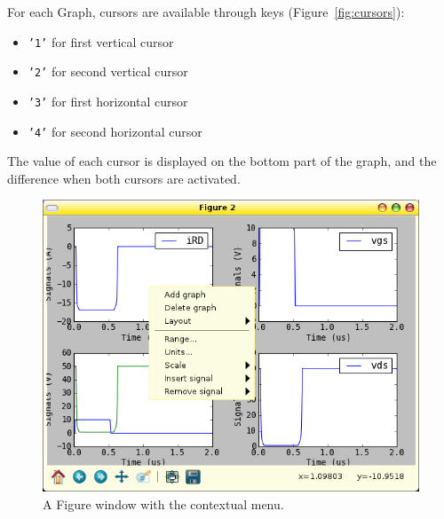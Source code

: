 \documentclass[a4paper,11pt]{article}
\begin{document}
For each Graph, cursors are available through keys (Figure~\ref{fig:cursors}):
\begin{itemize}
\item \texttt{'1'} for first vertical cursor
\item \texttt{'2'} for second vertical cursor
\item \texttt{'3'} for first horizontal cursor
\item \texttt{'4'} for second horizontal cursor
\end{itemize}
The value of each cursor is displayed on the bottom part of the graph, and the difference when both cursors are activated.

\begin{figure}[htbp]
  \centering
  \includegraphics[scale=.5]{../png/ioscopy-figure}
  \caption{A Figure window with the contextual menu.}
  \label{fig:fig}


\end{figure}
\end{document}
